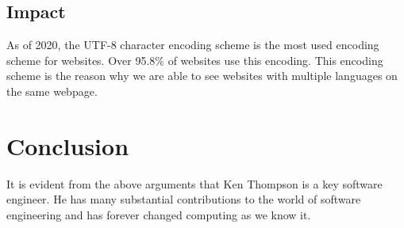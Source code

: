 \documentclass{article}
\begin{document}
\subsection{Impact}
As of 2020, the UTF-8 character encoding scheme is the most used encoding
scheme for websites. Over 95.8\% of websites use this
encoding.\cite{web2020tech} This encoding scheme is the reason why we are able
to see websites with multiple languages on the same webpage.

\section{Conclusion}
It is evident from the above arguments that Ken Thompson is a key software
engineer. He has many substantial contributions to the world of software
engineering and has forever changed computing as we know it.



\end{document}
